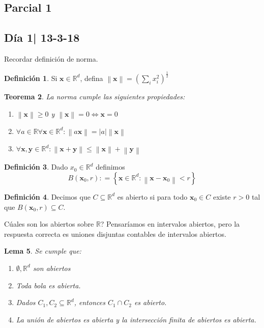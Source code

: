 \documentclass[12pt]{article}
\theoremstyle{plain}
\newtheorem{Th}{Teorema}[subsection]   %
\newtheorem{Lem}[Th]{Lema}             %
\theoremstyle{definition}
\newtheorem{Def}[Th]{Definición}       %
\theoremstyle{remark}
\numberwithin{equation}{section}
\newcommand{\bR}{\mathbb{R}}        %
\renewcommand{\geq}{\geqslant}      %
\renewcommand{\leq}{\leqslant}      %
\renewcommand{\:}{\colon}           %
\renewcommand{\vec}[1]{\mathbf{#1}}
\newcommand{\vx}{\vec{x}}           %
\newcommand{\vy}{\vec{y}}
\newcommand{\conj}[1]{\left\lbrace#1\right\rbrace}
\newcommand{\nm}[1]{\left\|#1\right\|} %
\begin{document}
\begin{multicols}{2}

\section{Parcial 1}
\subsection{Día 1| 13-3-18}
Recordar definición de norma.
\begin{Def}
Si $\vec{x}\in\bR^d$, defina $\nm{\vec{x}}=\left(\sum_{i}x_i^2\right)^{\frac{1}{2}}$
\end{Def}

\begin{Th}
La norma cumple las siguientes propiedades:
\begin{enumerate}
  \item $\nm{\vec{x}}\geq 0$ y $\nm{\vec{x}} = 0\iff \vec{x}= 0$
  \item $\forall a\in\bR\forall \vx\in\bR^d: \nm{a\vec{x}} = |a|\nm{\vec{x}}$
  \item $\forall \vx,\vy \in\bR^d : \nm{\vec{x}+\vec{y}}\leq \nm{\vec{x}}+\nm{\vec{y}}$
\end{enumerate}
\end{Th}

\begin{Def}
  Dado $x_0\in\bR^d$ definimos $$B(\vx_0,r)\colon = \conj{\vx\in\bR^d: \nm{\vx-\vx_0}< r}$$
\end{Def}

\begin{Def}
 Decimos que $C\subseteq\bR^d$ es abierto si para todo $\vx_0\in C$ existe $r>0$ tal que $B(\vx_0,r)\subseteq C$.
\end{Def}
Cúales son los abiertos sobre $\bR$? Pensaríamos en intervalos abiertos, pero la respuesta correcta es uniones disjuntas contables de intervalos abiertos.

\begin{Lem}\label{lem:propiedadesConjsAbiertos}
Se cumple que:
  \begin{enumerate}
    \item $\emptyset, \bR^d$ son abiertos
    \item Toda bola es abierta.
    \item Dados $C_1,C_2\subseteq \bR^d$, entonces $C_1\cap C_2$ es abierto.
    \item La unión de abiertos es abierta y la intersección finita de abiertos es abierta.
  \end{enumerate}
\end{Lem}


\end{multicols}
\end{document}
